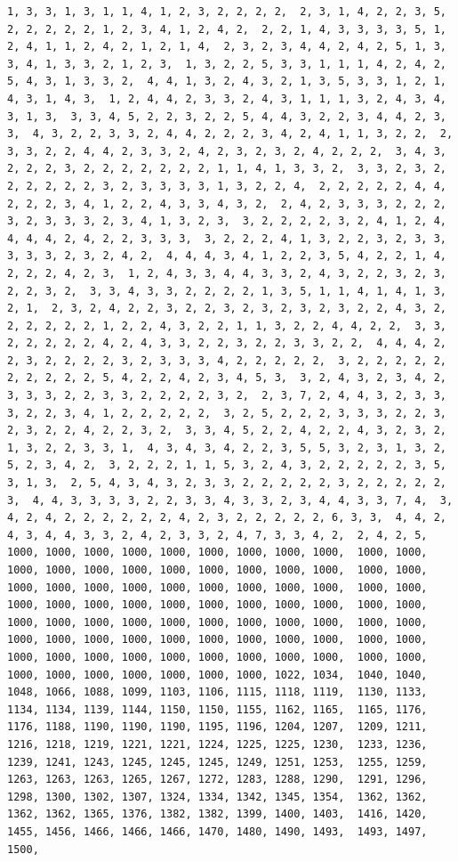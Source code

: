 \documentclass[
]{article}
\begin{document}
\begin{verbatim}
1, 3, 3, 1, 3, 1, 1, 4, 1, 2, 3, 2, 2, 2, 2,  2, 3, 1, 4, 2, 2, 3, 5, 2, 2, 2, 2, 2, 1, 2, 3, 4, 1, 2, 4, 2,  2, 2, 1, 4, 3, 3, 3, 3, 5, 1, 2, 4, 1, 1, 2, 4, 2, 1, 2, 1, 4,  2, 3, 2, 3, 4, 4, 2, 4, 2, 5, 1, 3, 3, 4, 1, 3, 3, 2, 1, 2, 3,  1, 3, 2, 2, 5, 3, 3, 1, 1, 1, 4, 2, 4, 2, 5, 4, 3, 1, 3, 3, 2,  4, 4, 1, 3, 2, 4, 3, 2, 1, 3, 5, 3, 3, 1, 2, 1, 4, 3, 1, 4, 3,  1, 2, 4, 4, 2, 3, 3, 2, 4, 3, 1, 1, 1, 3, 2, 4, 3, 4, 3, 1, 3,  3, 3, 4, 5, 2, 2, 3, 2, 2, 5, 4, 4, 3, 2, 2, 3, 4, 4, 2, 3, 3,  4, 3, 2, 2, 3, 3, 2, 4, 4, 2, 2, 2, 3, 4, 2, 4, 1, 1, 3, 2, 2,  2, 3, 3, 2, 2, 4, 4, 2, 3, 3, 2, 4, 2, 3, 2, 3, 2, 4, 2, 2, 2,  3, 4, 3, 2, 2, 2, 3, 2, 2, 2, 2, 2, 2, 2, 1, 1, 4, 1, 3, 3, 2,  3, 3, 2, 3, 2, 2, 2, 2, 2, 2, 3, 2, 3, 3, 3, 3, 1, 3, 2, 2, 4,  2, 2, 2, 2, 2, 4, 4, 2, 2, 2, 3, 4, 1, 2, 2, 4, 3, 3, 4, 3, 2,  2, 4, 2, 3, 3, 3, 2, 2, 2, 3, 2, 3, 3, 3, 2, 3, 4, 1, 3, 2, 3,  3, 2, 2, 2, 2, 3, 2, 4, 1, 2, 4, 4, 4, 4, 2, 4, 2, 2, 3, 3, 3,  3, 2, 2, 2, 4, 1, 3, 2, 2, 3, 2, 3, 3, 3, 3, 3, 2, 3, 2, 4, 2,  4, 4, 4, 3, 4, 1, 2, 2, 3, 5, 4, 2, 2, 1, 4, 2, 2, 2, 4, 2, 3,  1, 2, 4, 3, 3, 4, 4, 3, 3, 2, 4, 3, 2, 2, 3, 2, 3, 2, 2, 3, 2,  3, 3, 4, 3, 3, 2, 2, 2, 2, 1, 3, 5, 1, 1, 4, 1, 4, 1, 3, 2, 1,  2, 3, 2, 4, 2, 2, 3, 2, 2, 3, 2, 3, 2, 3, 2, 3, 2, 2, 4, 3, 2,  2, 2, 2, 2, 2, 1, 2, 2, 4, 3, 2, 2, 1, 1, 3, 2, 2, 4, 4, 2, 2,  3, 3, 2, 2, 2, 2, 2, 4, 2, 4, 3, 3, 2, 2, 3, 2, 2, 3, 3, 2, 2,  4, 4, 4, 2, 2, 3, 2, 2, 2, 2, 3, 2, 3, 3, 3, 4, 2, 2, 2, 2, 2,  3, 2, 2, 2, 2, 2, 2, 2, 2, 2, 2, 5, 4, 2, 2, 4, 2, 3, 4, 5, 3,  3, 2, 4, 3, 2, 3, 4, 2, 3, 3, 3, 2, 2, 3, 3, 2, 2, 2, 2, 3, 2,  2, 3, 7, 2, 4, 4, 3, 2, 3, 3, 3, 2, 2, 3, 4, 1, 2, 2, 2, 2, 2,  3, 2, 5, 2, 2, 2, 3, 3, 3, 2, 2, 3, 2, 3, 2, 2, 4, 2, 2, 3, 2,  3, 3, 4, 5, 2, 2, 4, 2, 2, 4, 3, 2, 3, 2, 1, 3, 2, 2, 3, 3, 1,  4, 3, 4, 3, 4, 2, 2, 3, 5, 5, 3, 2, 3, 1, 3, 2, 5, 2, 3, 4, 2,  3, 2, 2, 2, 1, 1, 5, 3, 2, 4, 3, 2, 2, 2, 2, 2, 3, 5, 3, 1, 3,  2, 5, 4, 3, 4, 3, 2, 3, 3, 2, 2, 2, 2, 2, 3, 2, 2, 2, 2, 2, 3,  4, 4, 3, 3, 3, 3, 2, 2, 3, 3, 4, 3, 3, 2, 3, 4, 4, 3, 3, 7, 4,  3, 4, 2, 4, 2, 2, 2, 2, 2, 2, 4, 2, 3, 2, 2, 2, 2, 2, 6, 3, 3,  4, 4, 2, 4, 3, 4, 4, 3, 3, 2, 4, 2, 3, 3, 2, 4, 7, 3, 3, 4, 2,  2, 4, 2, 5, 1000, 1000, 1000, 1000, 1000, 1000, 1000, 1000, 1000,  1000, 1000, 1000, 1000, 1000, 1000, 1000, 1000, 1000, 1000, 1000,  1000, 1000, 1000, 1000, 1000, 1000, 1000, 1000, 1000, 1000, 1000,  1000, 1000, 1000, 1000, 1000, 1000, 1000, 1000, 1000, 1000, 1000,  1000, 1000, 1000, 1000, 1000, 1000, 1000, 1000, 1000, 1000, 1000,  1000, 1000, 1000, 1000, 1000, 1000, 1000, 1000, 1000, 1000, 1000,  1000, 1000, 1000, 1000, 1000, 1000, 1000, 1000, 1000, 1000, 1000,  1000, 1000, 1000, 1000, 1000, 1000, 1000, 1000, 1000, 1022, 1034,  1040, 1040, 1048, 1066, 1088, 1099, 1103, 1106, 1115, 1118, 1119,  1130, 1133, 1134, 1134, 1139, 1144, 1150, 1150, 1155, 1162, 1165,  1165, 1176, 1176, 1188, 1190, 1190, 1190, 1195, 1196, 1204, 1207,  1209, 1211, 1216, 1218, 1219, 1221, 1221, 1224, 1225, 1225, 1230,  1233, 1236, 1239, 1241, 1243, 1245, 1245, 1245, 1249, 1251, 1253,  1255, 1259, 1263, 1263, 1263, 1265, 1267, 1272, 1283, 1288, 1290,  1291, 1296, 1298, 1300, 1302, 1307, 1324, 1334, 1342, 1345, 1354,  1362, 1362, 1362, 1362, 1365, 1376, 1382, 1382, 1399, 1400, 1403,  1416, 1420, 1455, 1456, 1466, 1466, 1466, 1470, 1480, 1490, 1493,  1493, 1497, 1500, 
\end{verbatim}
\end{document}
